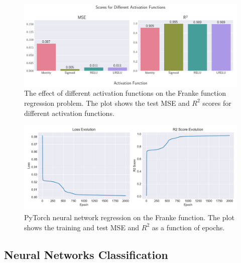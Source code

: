 \documentclass[aps,pra,english,notitlepage,reprint,nofootinbib]{revtex4-1}  %
\begin{document}
\begin{onecolumngrid}
    \begin{figure}[h!]
        \centering
        \includegraphics[width = .9\textwidth]{../figs/c_activation_funcs.pdf}
        \caption{The effect of different activation functions on the Franke function regression problem. The plot shows the test MSE and \( R^2 \) scores for different activation functions.}
        \label{fig:NN_Franke_activation}
    \end{figure}
\end{onecolumngrid}

\begin{onecolumngrid}
    \begin{figure}[h!]
        \centering
        \includegraphics[width = .9\textwidth]{../figs/nn_torch_franke.pdf}
        \caption{PyTorch neural network regression on the Franke function. The plot shows the training and test MSE and \( R^2 \) as a function of epochs.}
        \label{fig:NN_Torch_scores}
    \end{figure}
\end{onecolumngrid}

\subsection{Neural Networks Classification}
\end{document}
